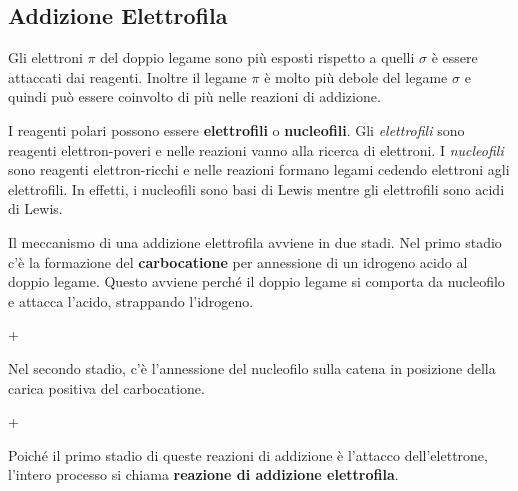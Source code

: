 
\subsection{Addizione Elettrofila}
Gli elettroni \(\pi\) del doppio legame sono più esposti rispetto a quelli \(\sigma\) è essere attaccati dai reagenti. Inoltre il legame \(\pi\) è molto più debole del legame \(\sigma\) e quindi può essere coinvolto di più nelle reazioni di addizione.

I reagenti polari possono essere \textbf{elettrofili} o \textbf{nucleofili}. Gli \textit{elettrofili} sono reagenti elettron-poveri e nelle reazioni vanno alla ricerca di elettroni. I \textit{nucleofili} sono reagenti elettron-ricchi e nelle reazioni formano legami cedendo elettroni agli elettrofili. In effetti, i nucleofili sono basi di Lewis mentre gli elettrofili sono acidi di Lewis.

Il meccanismo di una addizione elettrofila avviene in due stadi. Nel primo stadio c'è la formazione del \textbf{carbocatione} per annessione di un idrogeno acido al doppio legame. Questo avviene perché il doppio legame si comporta da nucleofilo e attacca l'acido, strappando l'idrogeno.
\chemnameinit{}
\begin{reaction*}
	 +  \arrow {}
\end{reaction*}
Nel secondo stadio, c'è l'annessione del nucleofilo sulla catena in posizione della carica positiva del carbocatione.
\chemnameinit{}
\begin{reaction*}
	 +  \arrow {}
\end{reaction*}

Poiché il primo stadio di queste reazioni di addizione è l'attacco dell'elettrone, l'intero processo si chiama \textbf{reazione di addizione elettrofila}.

